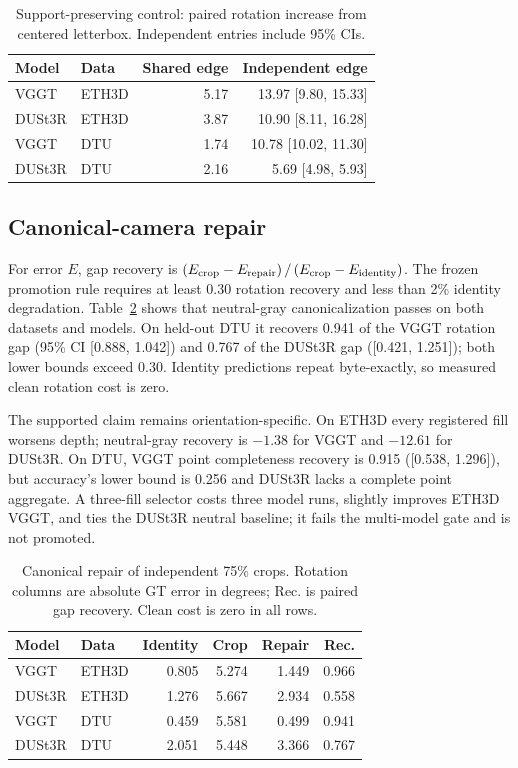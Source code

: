 \begin{table}[t]
  \centering
  \caption{Support-preserving control: paired rotation increase from centered
  letterbox.  Independent entries include 95\% CIs.}
  \label{tab:support-control}
  \setlength{\tabcolsep}{3.5pt}
  \begin{tabular}{llrr}
    \toprule
    Model & Data & Shared edge & Independent edge \\
    \midrule
    VGGT   & ETH3D & 5.17 & 13.97 [9.80, 15.33] \\
    DUSt3R & ETH3D & 3.87 & 10.90 [8.11, 16.28] \\
    VGGT   & DTU   & 1.74 & 10.78 [10.02, 11.30] \\
    DUSt3R & DTU   & 2.16 & 5.69 [4.98, 5.93] \\
    \bottomrule
  \end{tabular}
\end{table}

\subsection{Canonical-camera repair}
For error $E$, gap recovery is
$\left(E_{\rm crop}-E_{\rm repair}\right)/
 \left(E_{\rm crop}-E_{\rm identity}\right)$.
The frozen promotion rule requires at least 0.30 rotation recovery and less
than 2\% identity degradation.  Table~\ref{tab:repair} shows that neutral-gray
canonicalization passes on both datasets and models.  On held-out DTU it
recovers 0.941 of the VGGT rotation gap (95\% CI [0.888, 1.042]) and 0.767 of
the DUSt3R gap ([0.421, 1.251]); both lower bounds exceed 0.30.  Identity
predictions repeat byte-exactly, so measured clean rotation cost is zero.

The supported claim remains orientation-specific.  On ETH3D every registered
fill worsens depth; neutral-gray recovery is $-1.38$ for VGGT and $-12.61$ for
DUSt3R.  On DTU, VGGT point completeness recovery is 0.915 ([0.538, 1.296]),
but accuracy's lower bound is 0.256 and DUSt3R lacks a complete point aggregate.
A three-fill selector costs three model runs, slightly improves ETH3D VGGT,
and ties the DUSt3R neutral baseline; it fails the multi-model gate and is not
promoted.

\begin{table}[t]
  \centering
  \caption{Canonical repair of independent 75\% crops. Rotation columns are
  absolute GT error in degrees; Rec. is paired gap recovery. Clean cost is zero
  in all rows.}
  \label{tab:repair}
  \setlength{\tabcolsep}{3.5pt}
  \begin{tabular}{llrrrr}
    \toprule
    Model & Data & Identity & Crop & Repair & Rec. \\
    \midrule
    VGGT   & ETH3D & 0.805 & 5.274 & 1.449 & 0.966 \\
    DUSt3R & ETH3D & 1.276 & 5.667 & 2.934 & 0.558 \\
    VGGT   & DTU   & 0.459 & 5.581 & 0.499 & 0.941 \\
    DUSt3R & DTU   & 2.051 & 5.448 & 3.366 & 0.767 \\
    \bottomrule
  \end{tabular}
\end{table}

